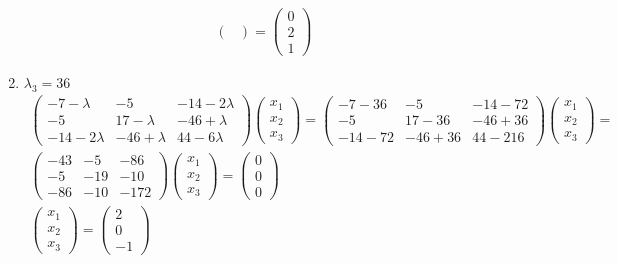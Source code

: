 \begin{enumerate}
\begin{gather*}
\begin{pmatrix}
				\end{pmatrix}
				=
				\begin{pmatrix}
					0 \\ 2 \\ 1
				\end{pmatrix}
			\end{gather*}
		\item $\lambda_3 = 36$
			\begin{gather*}
				\begin{pmatrix}
					-7-\lambda & -5 & -14-2\lambda\\
					-5 & 17-\lambda & -46+\lambda\\
					-14-2\lambda & -46+\lambda & 44-6\lambda
				\end{pmatrix}	
				\begin{pmatrix}
					x_1 \\ x_2 \\ x_3
				\end{pmatrix}
				=
				\begin{pmatrix}
					-7-36 & -5 & -14-72\\
					-5 & 17-36 & -46+36\\
					-14-72 & -46+36 & 44-216
				\end{pmatrix}	
				\begin{pmatrix}
					x_1 \\ x_2 \\ x_3
				\end{pmatrix}
				=\\
				\begin{pmatrix}
					-43 & -5 & -86\\
					-5 & -19 & -10\\
					-86 & -10 & -172
				\end{pmatrix}	
				\begin{pmatrix}
					x_1 \\ x_2 \\ x_3
				\end{pmatrix}
				=
				\begin{pmatrix}
					0 \\ 0 \\ 0
				\end{pmatrix}
				\\
				\begin{pmatrix}
				x_1 \\ x_2 \\ x_3
				\end{pmatrix}
				=
				\begin{pmatrix}
				2 \\ 0 \\ -1
				\end{pmatrix}
			\end{gather*}
		\end{enumerate}
